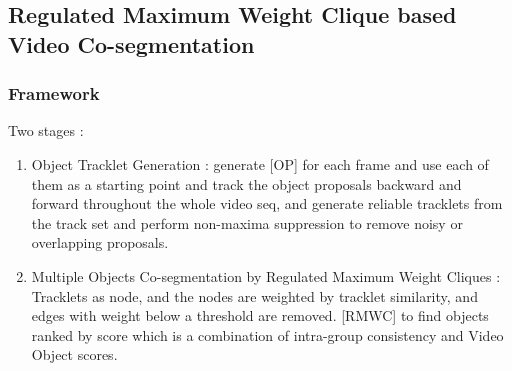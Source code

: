 \documentclass{article}
\begin{document}
\subsection{Regulated Maximum Weight Clique based Video Co-segmentation}
\subsubsection{Framework}
Two stages :
\begin{enumerate}
\item Object Tracklet Generation : generate [OP] for each frame and use each of them as a starting point and track the object proposals backward and forward throughout the whole video seq, and generate reliable tracklets from the track set and perform non-maxima suppression to remove noisy or overlapping proposals.
\item Multiple Objects Co-segmentation by Regulated Maximum Weight Cliques : Tracklets as node, and the nodes are weighted by tracklet similarity, and edges with weight below a threshold are removed. [RMWC] to find objects ranked by score which is a combination of intra-group consistency and Video Object scores.
\end{enumerate}
\end{document}
